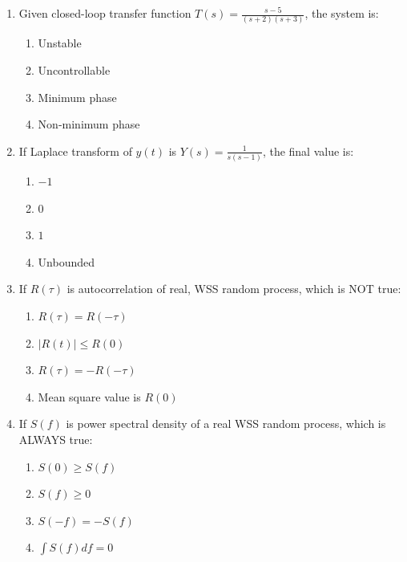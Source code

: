 \documentclass[journal,12pt,onecolumn]{IEEEtran}
\theoremstyle{remark}
\begin{document}
\begin{enumerate}
\item Given closed-loop transfer function $ T(s) = \frac{s - 5}{(s+2)(s+3)} $, the system is: 
\hfill{}
\begin{enumerate}
    \item Unstable
    \item Uncontrollable
    \item Minimum phase
    \item Non-minimum phase
\end{enumerate}

\item If Laplace transform of $ y(t) $ is $ Y(s) = \frac{1}{s(s - 1)} $, the final value is:
\hfill{}
\begin{multicols}{4}
\begin{enumerate}
    \item $-1$
    \item $0$
    \item $1$
    \item Unbounded
\end{enumerate}
\end{multicols}

\item If $ R(\tau) $ is autocorrelation of real, WSS random process, which is NOT true: 
\hfill{}
\begin{enumerate}
    \item $ R(\tau) = R(-\tau) $
    \item $ |R(t)| \leq R(0) $
    \item $ R(\tau) = -R(-\tau) $
    \item Mean square value is $ R(0) $
\end{enumerate}

\item If $ S(f) $ is power spectral density of a real WSS random process, which is ALWAYS true: 

\hfill{}
\begin{multicols}{4}
\begin{enumerate}
    \item $ S(0) \geq S(f) $
    \item $ S(f) \geq 0 $
    \item $ S(-f) = -S(f) $
    \item $ \int S(f) df = 0 $
\end{enumerate}
\end{multicols}


\end{enumerate}
\end{document}
